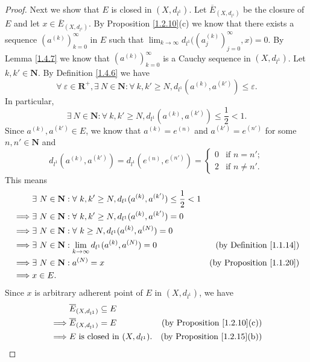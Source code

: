 \begin{proof}
    Next we show that \(E\) is closed in \((X, d_{l^1})\).
    Let \(\overline{E}_{(X, d_{l^1})}\) be the closure of \(E\) and let \(x \in \overline{E}_{(X, d_{l^1})}\).
    By Proposition \ref{1.2.10}(c) we know that there exists a sequence \((a^{(k)})_{k = 0}^\infty\) in \(E\) such that \(\lim_{k \to \infty} d_{l^1}\big((a_j^{(k)})_{j = 0}^\infty, x\big) = 0\).
    By Lemma \ref{1.4.7} we know that \((a^{(k)})_{k = 0}^\infty\) is a Cauchy sequence in \((X, d_{l^1})\).
    Let \(k, k' \in \mathbf{N}\).
    By Definition \ref{1.4.6} we have
    \[
        \forall\ \varepsilon \in \mathbf{R}^+, \exists\ N \in \mathbf{N} : \forall\ k, k' \geq N, d_{l^1}(a^{(k)}, a^{(k')}) \leq \varepsilon.
    \]
    In particular,
    \[
        \exists\ N \in \mathbf{N} : \forall\ k, k' \geq N, d_{l^1}(a^{(k)}, a^{(k')}) \leq \frac{1}{2} < 1.
    \]
    Since \(a^{(k)}, a^{(k')} \in E\), we know that \(a^{(k)} = e^{(n)}\) and \(a^{(k')} = e^{(n')}\) for some \(n, n' \in \mathbf{N}\) and
    \[
        d_{l^1}(a^{(k)}, a^{(k')}) = d_{l^1}(e^{(n)}, e^{(n')}) = \begin{cases}
            0 & \text{if } n = n';    \\
            2 & \text{if } n \neq n'.
        \end{cases}
    \]
    This means
    \begin{align*}
                 & \exists\ N \in \mathbf{N} : \forall\ k, k' \geq N, d_{l^1}(a^{(k)}, a^{(k')}) \leq \frac{1}{2} < 1                                        \\
        \implies & \exists\ N \in \mathbf{N} : \forall\ k, k' \geq N, d_{l^1}(a^{(k)}, a^{(k')}) = 0                                                         \\
        \implies & \exists\ N \in \mathbf{N} : \forall\ k \geq N, d_{l^1}(a^{(k)}, a^{(N)}) = 0                                                              \\
        \implies & \exists\ N \in \mathbf{N} : \lim_{k \to \infty} d_{l^1}(a^{(k)}, a^{(N)}) = 0                      & \text{(by Definition \ref{1.1.14})}  \\
        \implies & \exists\ N \in \mathbf{N} : a^{(N)} = x                                                            & \text{(by Proposition \ref{1.1.20})} \\
        \implies & x \in E.
    \end{align*}
    Since \(x\) is arbitrary adherent point of \(E\) in \((X, d_{l^1})\), we have
    \begin{align*}
                 & \overline{E}_{(X, d_{l^1})} \subseteq E                                           \\
        \implies & \overline{E}_{(X, d_{l^1})} = E         & \text{(by Proposition \ref{1.2.10}(c))} \\
        \implies & E \text{ is closed in } (X, d_{l^1}).   & \text{(by Proposition \ref{1.2.15}(b))}
    \end{align*}


\end{proof}
